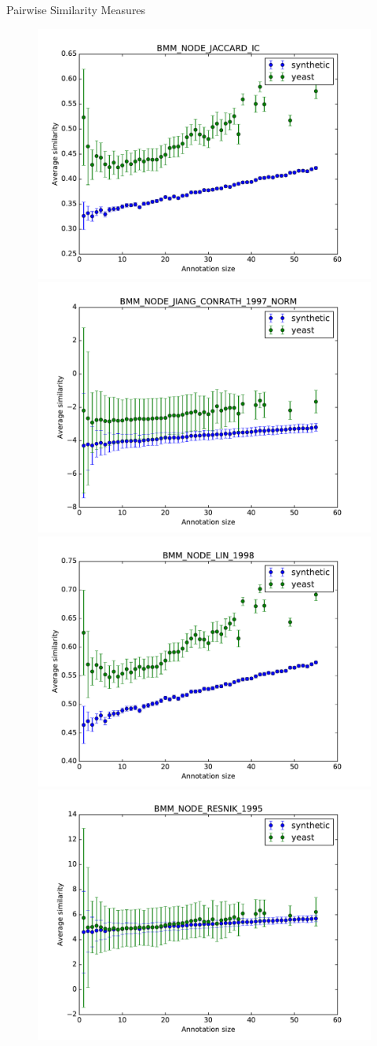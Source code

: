 \documentclass{beamer}
\begin{document}
\begin{frame}{Pairwise Similarity Measures}

\begin{figure}
\includegraphics[width=0.5\linewidth, height=0.4\textheight]{pairwise/SIM_GROUPWISE_BMM_SIM_PAIRWISE_DAG_NODE_JACCARD_IC_avg.pdf}
\includegraphics[width=0.5\linewidth, height=0.4\textheight]{pairwise/SIM_GROUPWISE_BMM_SIM_PAIRWISE_DAG_NODE_JIANG_CONRATH_1997_NORM_avg.pdf} \\
\includegraphics[width=0.5\linewidth, height=0.4\textheight]{pairwise/SIM_GROUPWISE_BMM_SIM_PAIRWISE_DAG_NODE_LIN_1998_avg.pdf}
\includegraphics[width=0.5\linewidth, height=0.4\textheight]{pairwise/SIM_GROUPWISE_BMM_SIM_PAIRWISE_DAG_NODE_RESNIK_1995_avg.pdf}
\end{figure}

\end{frame}
\end{document}
